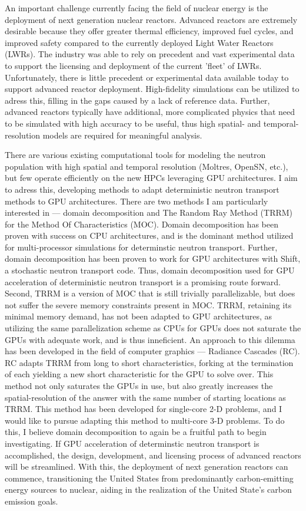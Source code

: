 \documentclass[12pt]{letter}
\begin{document}
An important challenge currently facing the field of nuclear energy is the deployment of next generation nuclear reactors. Advanced reactors are extremely desirable because they offer greater thermal efficiency, improved fuel cycles, and improved safety compared to the currently deployed Light Water Reactors (LWRs). The industry was able to rely on precedent and vast experimental data to support the licensing and deployment of the current 'fleet' of LWRs. Unfortunately, there is little precedent or experimental data available today to support advanced reactor deployment. High-fidelity simulations can be utilized to adress this, filling in the gaps caused by a lack of reference data. Further, advanced reactors typically have additional, more complicated physics that need to be simulated with high accuracy to be useful, thus high spatial- and temporal-resolution models are required for meaningful analysis. 

There are various existing computational tools for modeling the neutron population with high spatial and temporal resolution (Moltres, OpenSN, etc.), but few operate efficiently on the new HPCs leveraging GPU architectures. I aim to adress this, developing methods to adapt deterministic neutron transport methods to GPU architectures. There are two methods I am particularly interested in --- domain decomposition and The Random Ray Method (TRRM) for the Method Of Characteristics (MOC). Domain decomposition has been proven with success on CPU architectures, and is the dominant method utilized for multi-processor simulations for determinstic neutron transport. Further, domain decomposition has been proven to work for GPU architectures with Shift, a stochastic neutron transport code. Thus, domain decomposition used for GPU acceleration of deterministic neutron transport is a promising route forward. Second, TRRM is a version of MOC that is still trivially parallelizable, but does not suffer the severe memory constraints present in MOC. TRRM, retaining its minimal memory demand, has not been adapted to GPU architectures, as utilizing the same parallelization scheme as CPUs for GPUs does not saturate the GPUs with adequate work, and is thus inneficient. An approach to this dilemma has been developed in the field of computer graphics --- Radiance Cascades (RC). RC adapts TRRM from long to short characteristics, forking at the termination of each yielding a new short characteristic for the GPU to solve over. This method not only saturates the GPUs in use, but also greatly increases the spatial-resolution of the answer with the same number of starting locations as TRRM. This method has been developed for single-core 2-D problems, and I would like to pursue adapting this method to multi-core 3-D problems. To do this, I believe domain decomposition to again be a fruitful path to begin investigating.
If GPU acceleration of determinstic neutron transport is accomplished, the design, development, and licensing process of advanced reactors will be streamlined. With this, the deployment of next generation reactors can commence, transitioning the United States from predominantly carbon-emitting energy sources to nuclear, aiding in the realization of the United State's carbon emission goals.
\end{document}
